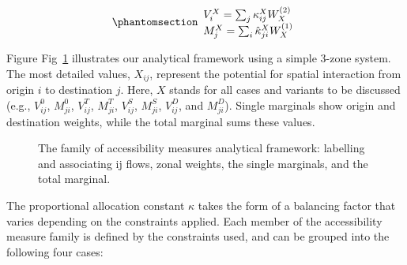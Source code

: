\documentclass[
  10pt,
  letterpaper,
]{article}
\begin{document}
\begin{equation}\phantomsection\label{eq-accesssibility-01}{
\begin{array}{l}
V_{i}^X = \sum_j \kappa_{ij}^X W_X^{(2)}\\
M_{j}^X = \sum_i \hat \kappa_{ji}^X W_X^{(1)}
\end{array}
}\end{equation}

Figure Fig~\ref{fig-analytical-device-conc-accessibility} illustrates
our analytical framework using a simple 3-zone system. The most detailed
values, \(X_{ij}\), represent the potential for spatial interaction from
origin \(i\) to destination \(j\). Here, \(X\) stands for all cases and
variants to be discussed (e.g., \(V_{ij}^0\), \(M_{ji}^0\),
\(V_{ij}^T\), \(M_{ji}^T\), \(V_{ij}^S\), \(M_{ji}^S\), \(V_{ij}^D\),
and \(M_{ji}^D\)). Single marginals show origin and destination weights,
while the total marginal sums these values.

\begin{figure}[H]


\caption{\label{fig-analytical-device-conc-accessibility}The family of
accessibility measures analytical framework: labelling and associating
ij flows, zonal weights, the single marginals, and the total marginal.}

\end{figure}%

The proportional allocation constant \(\kappa\) takes the form of a
balancing factor that varies depending on the constraints applied. Each
member of the accessibility measure family is defined by the constraints
used, and can be grouped into the following four cases:
\end{document}
